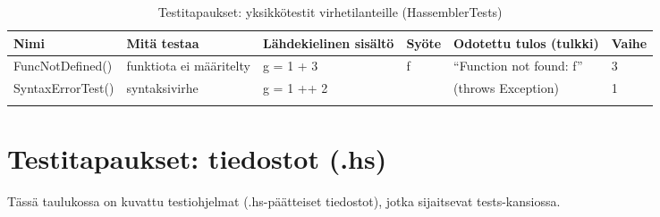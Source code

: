 \documentclass[11pt]{article} %
\begin{document}
\begin{table}[!htbp] %
\caption{Testitapaukset: yksikkötestit virhetilanteille (HassemblerTests)}
\begin{tabular}{|p{3cm}|p{3cm}|p{3cm}|p{}|p{3cm}|p{3cm}|}
\hline
\textbf{Nimi} & \textbf{Mitä testaa} & \textbf{Lähdekielinen sisältö} & \textbf{Syöte}  & \textbf{Odotettu tulos (tulkki)}  & \textbf{Vaihe} \\ \hline
 FuncNotDefined()  & funktiota ei määritelty   &  g = 1 + 3       &  f       &  ``Function not found: f''   &  3            \\ \hline
 SyntaxErrorTest()     & syntaksivirhe   &  g = 1 ++ 2    &           &   (throws Exception)   &    1     \\ \hline
              &                      &                       &           &                      &                            \\ \hline
              
             
\end{tabular}
\end{table}


\section{Testitapaukset: tiedostot (.hs)}


Tässä taulukossa on kuvattu testiohjelmat (.hs-päätteiset tiedostot), jotka sijaitsevat tests-kansiossa.
\end{document}

